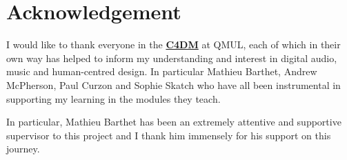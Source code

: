 

\section*{Acknowledgement}
I would like to thank everyone in the \textbf{\href{http://www.eecs.qmul.ac.uk/}{C4DM}} at QMUL, each of which in their own way has helped to inform my understanding and interest in digital audio, music and human-centred design. In particular Mathieu Barthet, Andrew McPherson, Paul Curzon and Sophie Skatch who have all been instrumental in supporting my learning in the modules they teach. 

In particular, Mathieu Barthet has been an extremely attentive and supportive supervisor to this project and I thank him immensely for his support on this journey. 